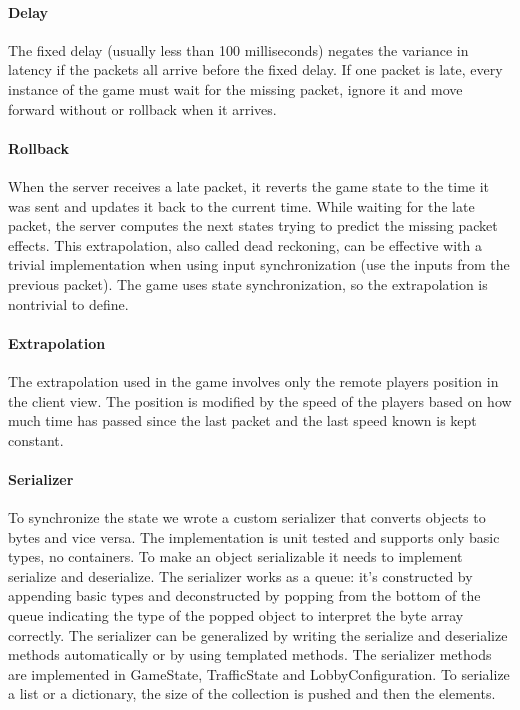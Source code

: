 \documentclass[12pt]{article}
\begin{document}
\paragraph{Delay}
The fixed delay (usually less than 100 milliseconds) negates the variance in latency if the packets all arrive before the fixed delay. If one packet is late, every instance of the game must wait for the missing packet, ignore it and move forward without or rollback when it arrives.

\paragraph{Rollback}
When the server receives a late packet, it reverts the game state to the time it was sent and updates it back to the current time. While waiting for the late packet, the server computes the next states trying to predict the missing packet effects. This extrapolation, also called dead reckoning, can be effective with a trivial implementation when using input synchronization (use the inputs from the previous packet). The game uses state synchronization, so the extrapolation is nontrivial to define.

\paragraph{Extrapolation}
The extrapolation used in the game involves only the remote players position in the client view. The position is modified by the speed of the players based on how much time has passed since the last packet and the last speed known is kept constant.

\paragraph{Serializer}
To synchronize the state we wrote a custom serializer that converts objects to bytes and vice versa. The implementation is unit tested and supports only basic types, no containers. To make an object serializable it needs to implement serialize and deserialize. The serializer works as a queue: it's constructed by appending basic types and deconstructed by popping from the bottom of the queue indicating the type of the popped object to interpret the byte array correctly. The serializer can be generalized by writing the serialize and deserialize methods automatically or by using templated methods. The serializer methods are implemented in GameState, TrafficState and LobbyConfiguration. To serialize a list or a dictionary, the size of the collection is pushed and then the elements.
\end{document}
